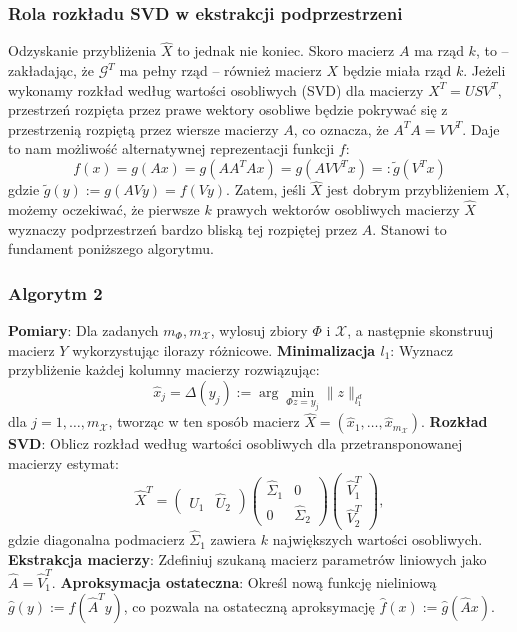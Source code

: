 \subsubsection{Rola rozkładu SVD w ekstrakcji podprzestrzeni}
Odzyskanie przybliżenia $\hat{X}$ to jednak nie koniec. Skoro macierz $A$ ma rząd $k$, to – zakładając, że $\mathcal{G}^T$ ma pełny rząd – również macierz $X$ będzie miała rząd $k$. Jeżeli wykonamy rozkład według wartości osobliwych (SVD) dla macierzy $X^T = U S V^T$, przestrzeń rozpięta przez prawe wektory osobliwe będzie pokrywać się z przestrzenią rozpiętą przez wiersze macierzy $A$, co oznacza, że $A^T A = V V^T$.
Daje to nam możliwość alternatywnej reprezentacji funkcji $f$:
$$f(x) = g(Ax) = g(AA^T Ax) = g(AVV^T x) =: \tilde{g}(V^T x)$$gdzie $\tilde{g}(y) := g(AVy) = f(Vy)$.
Zatem, jeśli $\hat{X}$ jest dobrym przybliżeniem $X$, możemy oczekiwać, że pierwsze $k$ prawych wektorów osobliwych macierzy $\hat{X}$ wyznaczy podprzestrzeń bardzo bliską tej rozpiętej przez $A$. Stanowi to fundament poniższego algorytmu.
\subsubsection{Algorytm 2}
\begin{algorithm}
\caption{Algorytm aproksymacji dla $k \geq 1$}\label{alg:wielowymiarowy}
    \begin{algorithmic}
        \State \textbf{Pomiary}: Dla zadanych $m_\Phi, m_\mathcal{X}$, wylosuj zbiory $\Phi$ i $\mathcal{X}$, a następnie skonstruuj macierz $Y$ wykorzystując ilorazy różnicowe.
        \State \textbf{Minimalizacja $l_1$}: Wyznacz przybliżenie każdej kolumny macierzy rozwiązując:$$\hat{x}_j = \Delta(y_j) := \arg\min_{\Phi z = y_j} \|z\|_{l_1^d}$$dla $j = 1, \dots, m_\mathcal{X}$, tworząc w ten sposób macierz $\hat{X} = (\hat{x}_1, \dots, \hat{x}_{m_\mathcal{X}})$.
        \State \textbf{Rozkład SVD}: Oblicz rozkład według wartości osobliwych dla przetransponowanej macierzy estymat:$$\hat{X}^T = \begin{pmatrix} \hat{U}_1 & \hat{U}_2 \end{pmatrix} \begin{pmatrix} \hat{\Sigma}_1 & 0 \\ 0 & \hat{\Sigma}_2 \end{pmatrix} \begin{pmatrix} \hat{V}_1^T \\ \hat{V}_2^T \end{pmatrix},$$gdzie diagonalna podmacierz $\hat{\Sigma}_1$ zawiera $k$ największych wartości osobliwych.
        \State \textbf{Ekstrakcja macierzy}: Zdefiniuj szukaną macierz parametrów liniowych jako $\hat{A} = \hat{V}_1^T$.
        \State \textbf{Aproksymacja ostateczna}: Określ nową funkcję nieliniową $\hat{g}(y) := f(\hat{A}^T y)$, co pozwala na ostateczną aproksymację $\hat{f}(x) := \hat{g}(\hat{A}x)$.
    \end{algorithmic}
\end{algorithm}

